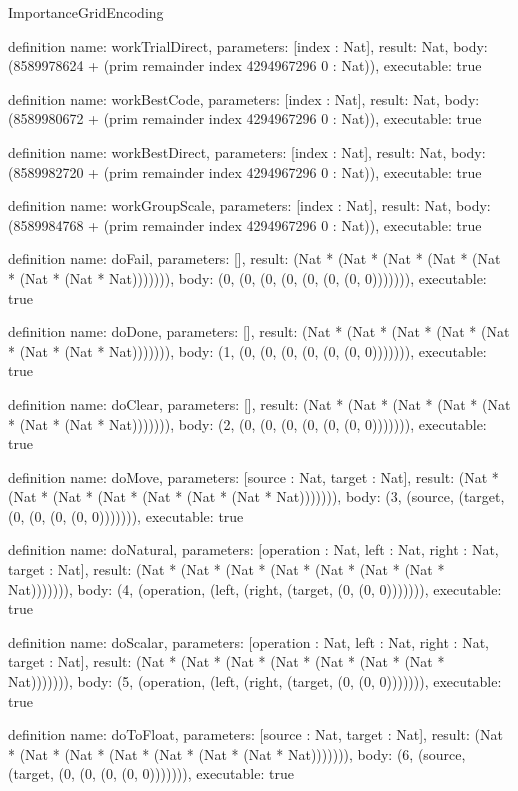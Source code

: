\begin{lexlean}{ImportanceGridEncoding}
\begin{semanticmodule}
definition{
  name: workTrialDirect,
  parameters: [index : Nat],
  result: Nat,
  body: (8589978624 + (prim remainder index 4294967296 0 : Nat)),
  executable: true
}

definition{
  name: workBestCode,
  parameters: [index : Nat],
  result: Nat,
  body: (8589980672 + (prim remainder index 4294967296 0 : Nat)),
  executable: true
}

definition{
  name: workBestDirect,
  parameters: [index : Nat],
  result: Nat,
  body: (8589982720 + (prim remainder index 4294967296 0 : Nat)),
  executable: true
}

definition{
  name: workGroupScale,
  parameters: [index : Nat],
  result: Nat,
  body: (8589984768 + (prim remainder index 4294967296 0 : Nat)),
  executable: true
}

definition{
  name: doFail,
  parameters: [],
  result: (Nat * (Nat * (Nat * (Nat * (Nat * (Nat * (Nat * Nat))))))),
  body: (0, (0, (0, (0, (0, (0, (0, 0))))))),
  executable: true
}

definition{
  name: doDone,
  parameters: [],
  result: (Nat * (Nat * (Nat * (Nat * (Nat * (Nat * (Nat * Nat))))))),
  body: (1, (0, (0, (0, (0, (0, (0, 0))))))),
  executable: true
}

definition{
  name: doClear,
  parameters: [],
  result: (Nat * (Nat * (Nat * (Nat * (Nat * (Nat * (Nat * Nat))))))),
  body: (2, (0, (0, (0, (0, (0, (0, 0))))))),
  executable: true
}

definition{
  name: doMove,
  parameters: [source : Nat, target : Nat],
  result: (Nat * (Nat * (Nat * (Nat * (Nat * (Nat * (Nat * Nat))))))),
  body: (3, (source, (target, (0, (0, (0, (0, 0))))))),
  executable: true
}

definition{
  name: doNatural,
  parameters: [operation : Nat, left : Nat, right : Nat, target : Nat],
  result: (Nat * (Nat * (Nat * (Nat * (Nat * (Nat * (Nat * Nat))))))),
  body: (4, (operation, (left, (right, (target, (0, (0, 0))))))),
  executable: true
}

definition{
  name: doScalar,
  parameters: [operation : Nat, left : Nat, right : Nat, target : Nat],
  result: (Nat * (Nat * (Nat * (Nat * (Nat * (Nat * (Nat * Nat))))))),
  body: (5, (operation, (left, (right, (target, (0, (0, 0))))))),
  executable: true
}

definition{
  name: doToFloat,
  parameters: [source : Nat, target : Nat],
  result: (Nat * (Nat * (Nat * (Nat * (Nat * (Nat * (Nat * Nat))))))),
  body: (6, (source, (target, (0, (0, (0, (0, 0))))))),
  executable: true
}


\end{semanticmodule}
\end{lexlean}
